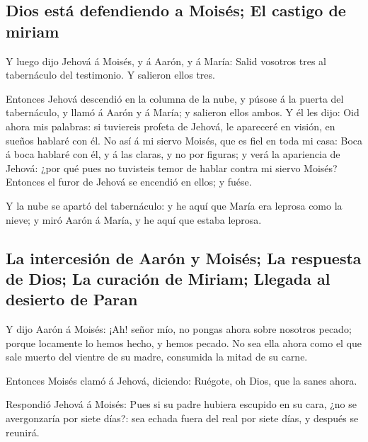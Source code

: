 \hypertarget{dios-estuxe1-defendiendo-a-moisuxe9s-el-castigo-de-miriam}{%
\subsection{Dios está defendiendo a Moisés; El castigo de
miriam}\label{dios-estuxe1-defendiendo-a-moisuxe9s-el-castigo-de-miriam}}

 Y luego dijo Jehová á Moisés, y á Aarón, y á María: Salid
vosotros tres al tabernáculo del testimonio. Y salieron ellos tres.

 Entonces Jehová descendió en la columna de la nube, y
púsose á la puerta del tabernáculo, y llamó á Aarón y á María; y
salieron ellos ambos.  Y él les dijo: Oid ahora mis
palabras: si tuviereis profeta de Jehová, le apareceré en visión, en
sueños hablaré con él.  No así á mi siervo Moisés, que es
fiel en toda mi casa:  Boca á boca hablaré con él, y á las
claras, y no por figuras; y verá la apariencia de Jehová: ¿por qué pues
no tuvisteis temor de hablar contra mi siervo Moisés? 
Entonces el furor de Jehová se encendió en ellos; y fuése.

 Y la nube se apartó del tabernáculo: y he aquí que María
era leprosa como la nieve; y miró Aarón á María, y he aquí que estaba
leprosa.

\hypertarget{la-intercesiuxf3n-de-aaruxf3n-y-moisuxe9s-la-respuesta-de-dios-la-curaciuxf3n-de-miriam-llegada-al-desierto-de-paran}{%
\subsection{La intercesión de Aarón y Moisés; La respuesta de Dios; La
curación de Miriam; Llegada al desierto de
Paran}\label{la-intercesiuxf3n-de-aaruxf3n-y-moisuxe9s-la-respuesta-de-dios-la-curaciuxf3n-de-miriam-llegada-al-desierto-de-paran}}

 Y dijo Aarón á Moisés: ¡Ah! señor mío, no pongas ahora
sobre nosotros pecado; porque locamente lo hemos hecho, y hemos pecado.
 No sea ella ahora como el que sale muerto del vientre de
su madre, consumida la mitad de su carne.

 Entonces Moisés clamó á Jehová, diciendo: Ruégote, oh
Dios, que la sanes ahora.

 Respondió Jehová á Moisés: Pues si su padre hubiera
escupido en su cara, ¿no se avergonzaría por siete días?: sea echada
fuera del real por siete días, y después se reunirá.

